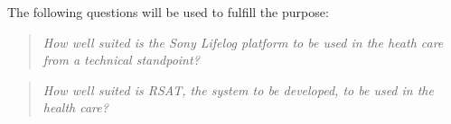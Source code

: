 \documentclass{cslthse-msc}
\begin{document}
The following questions will be used to fulfill the purpose: 

\begin{quote}
\centering
\emph{How well suited is the Sony Lifelog platform to be used in the heath care from a technical standpoint?}
\end{quote}

\begin{quote}
\centering
\emph{How well suited is RSAT, the system to be developed, to be used in the health care?}
\end{quote}

\end{document}

